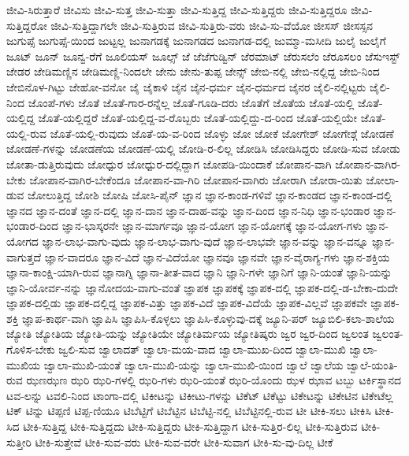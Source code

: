 {ಜೀವಿ-ಸಿರುತ್ತಾರೆ
ಜೀವಿಸು
ಜೀವಿ-ಸುತ್ತ
ಜೀವಿ-ಸುತ್ತಾ
ಜೀವಿ-ಸುತ್ತಿದ್ದ
ಜೀವಿ-ಸುತ್ತಿದ್ದರು
ಜೀವಿ-ಸುತ್ತಿದ್ದರೂ
ಜೀವಿ-ಸುತ್ತಿದ್ದರೋ
ಜೀವಿ-ಸುತ್ತಿದ್ದಾಗಲೇ
ಜೀವಿ-ಸುತ್ತಿರುವ
ಜೀವಿ-ಸುತ್ತಿರು-ವರು
ಜೀವಿ-ಸು-ವೆಯೋ
ಜೀಸಸ್
ಜೀಸಸ್ಸನ
ಜುಗುಪ್ಸೆ
ಜುಗುಪ್ಸೆ-ಯಿಂದ
ಜುಟ್ಟಲ್ಲ
ಜುನಾಗಡಕ್ಕೆ
ಜುನಾಗಡದ
ಜುನಾಗಡ-ದಲ್ಲಿ
ಜುಮ್ಮಾ-ಮಸೀದಿ
ಜುಲೈ
ಜುಲೈಗೆ
ಜೂಟ್
ಜೂನ್
ಜೂನ್ವ-ರೆಗೆ
ಜೂಲಿಯಸ್
ಜೂಲ್ಸ್
ಜೆ
ಜೆಜೆಗುಡ್ವಿನ್
ಜೆರಮಾಟ್
ಜೆರುಸಲೆಂ
ಜೆರೂಸಲಂ
ಜೆಸುಇಸ್ಟ್
ಜೇಡರ
ಜೇಡಿಮಣ್ಣಿನ
ಜೇಡಿಮಣ್ಣಿ-ನಿಂದಲೇ
ಜೇನು
ಜೇನು-ತುಪ್ಪ
ಜೇನ್ಸ್
ಜೇಬಿ-ನಲ್ಲಿ
ಜೇಬಿ-ನಲ್ಲಿದ್ದ
ಜೇಬಿ-ನಿಂದ
ಜೇಬಿನೊಳ-ಗಿಟ್ಟು
ಜೇಹೋ-ವನೋ
ಜೈ
ಜೈಕಾಳಿ
ಜೈನ
ಜೈನ-ಧರ್ಮ
ಜೈನ-ಧರ್ಮದ
ಜೈನರ
ಜೈಲಿ-ನಲ್ಲಿಟ್ಟರು
ಜೈಲಿ-ನಿಂದ
ಜೊಂಪೆ-ಗಳು
ಜೊತೆ
ಜೊತೆ-ಗಾರ-ರನ್ನೆಲ್ಲ
ಜೊತೆ-ಗೂಡಿ-ದರು
ಜೊತೆಗೆ
ಜೊತೆಯ
ಜೊತೆ-ಯಲ್ಲಿ
ಜೊತೆ-ಯಲ್ಲಿದ್ದ
ಜೊತೆ-ಯಲ್ಲಿದ್ದರೆ
ಜೊತೆ-ಯಲ್ಲಿದ್ದ-ವ-ರೊಬ್ಬರು
ಜೊತೆ-ಯಲ್ಲಿದ್ದು-ದ-ರಿಂದ
ಜೊತೆ-ಯಲ್ಲಿಯೇ
ಜೊತೆ-ಯಲ್ಲಿ-ರುವ
ಜೊತೆ-ಯಲ್ಲಿ-ರುವುದು
ಜೊತೆ-ಯ-ವ-ರಿಂದ
ಜೊಳ್ಳು
ಜೋ
ಜೋಕೆ
ಜೋಗೇಶ್
ಜೋಗೇಶ್ಗೆ
ಜೋಡಣೆ
ಜೋಡಣೆ-ಗಳನ್ನು
ಜೋಡಣೆಯ
ಜೋಡಣೆ-ಯಲ್ಲಿ
ಜೋಡಿ-ರ-ಲಿಲ್ಲ
ಜೋಡಿಸಿ
ಜೋಡಿಸಿದ್ದರು
ಜೋಡಿ-ಸುವ
ಜೋಡು
ಜೋತಾ-ಡುತ್ತಿರುವುದು
ಜೋಧ್ಪುರ
ಜೋಧ್ಪುರ-ದಲ್ಲಿದ್ದಾಗ
ಜೋಪಡಿ-ಯಿಂದಾಕೆ
ಜೋಪಾನ-ವಾಗಿ
ಜೋಪಾನ-ವಾಗಿರ-ಬೇಕು
ಜೋಪಾನ-ವಾಗಿರ-ಬೇಕೆಂದೂ
ಜೋಪಾನ-ವಾ-ಗಿರಿ
ಜೋಪಾನ-ವಾಗಿರು
ಜೋರಾಗಿ
ಜೋರಾ-ಯಿತು
ಜೋಲಾ-ಡುವ
ಜೋಲುತ್ತಿದ್ದ
ಜೋಶಿ
ಜೋಷಿ
ಜೋಸಿ-ಪೈನ್
ಜ್ಞಾನ
ಜ್ಞಾನ-ಕಾಂಡ-ಗಳಿವೆ
ಜ್ಞಾನ-ಕಾಂಡದ
ಜ್ಞಾನ-ಕಾಂಡ-ದಲ್ಲಿ
ಜ್ಞಾನದ
ಜ್ಞಾನ-ದಂತೆ
ಜ್ಞಾನ-ದಲ್ಲಿ
ಜ್ಞಾನ-ದಾನ
ಜ್ಞಾನ-ದಾಹ-ವನ್ನು
ಜ್ಞಾನ-ದಿಂದ
ಜ್ಞಾನ-ನಿಧಿ
ಜ್ಞಾನ-ಭಂಡಾರ
ಜ್ಞಾನ-ಭಂಡಾರ-ದಿಂದ
ಜ್ಞಾನ-ಭಾಸ್ಕರನೇ
ಜ್ಞಾನ-ಮಾರ್ಗವೂ
ಜ್ಞಾನ-ಯೋಗ
ಜ್ಞಾನ-ಯೋಗಕ್ಕೆ
ಜ್ಞಾನ-ಯೋಗ-ಗಳು
ಜ್ಞಾನ-ಯೋಗದ
ಜ್ಞಾನ-ಲಾಭ-ವಾಗು-ವುದು
ಜ್ಞಾನ-ಲಾಭ-ವಾಗು-ವುದೆ
ಜ್ಞಾನ-ಲಾಭವೇ
ಜ್ಞಾನ-ವನ್ನು
ಜ್ಞಾನ-ವನ್ನೂ
ಜ್ಞಾನ-ವಾಗುತ್ತದೆ
ಜ್ಞಾನ-ವಾದರೂ
ಜ್ಞಾನ-ವಿದೆ
ಜ್ಞಾನ-ವಿದೆಯೋ
ಜ್ಞಾನವೂ
ಜ್ಞಾನವೇ
ಜ್ಞಾನ-ವೈರಾಗ್ಯ-ಗಳು
ಜ್ಞಾನ-ಶಕ್ತಿಯ
ಜ್ಞಾನಾ-ಕಾಂಕ್ಷಿ-ಯಾಗಿ-ರುವ
ಜ್ಞಾನಾಗ್ನಿ
ಜ್ಞಾನಾ-ತೀತ-ವಾದ
ಜ್ಞಾನಿ
ಜ್ಞಾನಿ-ಗಳೇ
ಜ್ಞಾನಿಗೆ
ಜ್ಞಾನಿ-ಯಂತೆ
ಜ್ಞಾನಿ-ಯನ್ನು
ಜ್ಞಾನಿ-ಯೋರ್ವ-ನನ್ನು
ಜ್ಞಾನೋದಯ-ವಾಗು-ವಂತೆ
ಜ್ಞಾಪಕ
ಜ್ಞಾಪಕಕ್ಕೆ
ಜ್ಞಾಪಕ-ದಲ್ಲಿ
ಜ್ಞಾಪಕ-ದಲ್ಲಿ-ಡ-ಬೇಕಾ-ದುದೇ
ಜ್ಞಾಪಕ-ದಲ್ಲಿಡು
ಜ್ಞಾಪಕ-ದಲ್ಲಿದ್ದ
ಜ್ಞಾಪಕ-ವಿತ್ತು
ಜ್ಞಾಪಕ-ವಿದೆ
ಜ್ಞಾಪಕ-ವಿದೆಯೆ
ಜ್ಞಾಪಕ-ವಿಲ್ಲವೆ
ಜ್ಞಾಪಕವೇ
ಜ್ಞಾಪಕ-ಶಕ್ತಿ
ಜ್ಞಾಪ-ಕಾರ್ಥ-ವಾಗಿ
ಜ್ಞಾಪಿಸಿ
ಜ್ಞಾಪಿಸಿ-ಕೊಳ್ಳಲು
ಜ್ಞಾಪಿಸಿ-ಕೊಳ್ಳುವು-ದಕ್ಕೆ
ಜ್ಯೂನಿ-ಪರ್
ಜ್ಯೂಬಿಲಿ-ಕಲಾ-ಶಾಲೆಯ
ಜ್ಯೋತಿ
ಜ್ಯೋತಿಯ
ಜ್ಯೋತಿ-ಯನ್ನು
ಜ್ಯೋತಿಯೇ
ಜ್ಯೋತಿರ್ಮಯ
ಜ್ಯೋತಿಷ್ಕರು
ಜ್ವರ
ಜ್ವರ-ದಿಂದ
ಜ್ವಲಂತ
ಜ್ವಲಂತ-ಗೊಳಿಸ-ಬೇಕು
ಜ್ವಲಿ-ಸುವ
ಜ್ವಾಲಾದತ್
ಜ್ವಾಲಾ-ಮಯ-ವಾದ
ಜ್ವಾಲಾ-ಮುಖ-ದಿಂದ
ಜ್ವಾಲಾ-ಮುಖಿ
ಜ್ವಾಲಾ-ಮುಖಿಯ
ಜ್ವಾಲಾ-ಮುಖಿ-ಯಂತೆ
ಜ್ವಾಲಾ-ಮುಖಿ-ಯನ್ನು
ಜ್ವಾಲಾ-ಮುಖಿ-ಯಿಂದ
ಜ್ವಾಲೆ
ಜ್ವಾಲೆಯ
ಜ್ವಾಲೆ-ಯಂತಿ-ರುವ
ಝಣಝಣ
ಝರಿ
ಝರಿ-ಗಳಲ್ಲಿ
ಝರಿ-ಗಳು
ಝರಿ-ಯಂತೆ
ಝರಿ-ಯೊಂದು
ಝಳ
ಝಾವ
ಟಬ್ಬು
ಟರ್ಕಿಸ್ಥಾನದ
ಟವ-ಲನ್ನು
ಟವಲಿ-ನಿಂದ
ಟಾಂಗಾ-ದಲ್ಲಿ
ಟಿಕೀಟನ್ನು
ಟಿಕೀಟು-ಗಳನ್ನು
ಟಿಕೆಟ್
ಟಿಕೆಟ್ಟು
ಟಿಕೇಟನ್ನು
ಟಿಕೇಟಿನ
ಟಿಕೇಟೆಲ್ಲ
ಟಿಕ್
ಟಿನ್ನು
ಟಿಪ್ಪಣಿ
ಟಿಪ್ಪ-ಣಿಯೂ
ಟಿಬೆಟ್ಟಿಗೆ
ಟಿಬೆಟ್ಟಿನ
ಟಿಬೆಟ್ಟಿ-ನಲ್ಲಿ
ಟಿಬೆಟ್ಟಿನಲ್ಲಿ-ರುವ
ಟೀ
ಟೀಕಿ-ಸಲು
ಟೀಕಿಸಿ
ಟೀಕಿ-ಸಿದ
ಟೀಕಿ-ಸುತ್ತಿದ್ದ
ಟೀಕಿ-ಸುತ್ತಿದ್ದದು
ಟೀಕಿ-ಸುತ್ತಿದ್ದರು
ಟೀಕಿ-ಸುತ್ತಿದ್ದಾಗ
ಟೀಕಿ-ಸುತ್ತಿರ-ಲಿಲ್ಲ
ಟೀಕಿ-ಸುತ್ತಿರುವ
ಟೀಕಿ-ಸುತ್ತೀರಿ
ಟೀಕಿ-ಸುತ್ತೇವೆ
ಟೀಕಿ-ಸುವ-ವರು
ಟೀಕಿ-ಸುವ-ವರೇ
ಟೀಕಿ-ಸುವಾಗ
ಟೀಕಿ-ಸು-ವು-ದಿಲ್ಲ
ಟೀಕೆ
}
